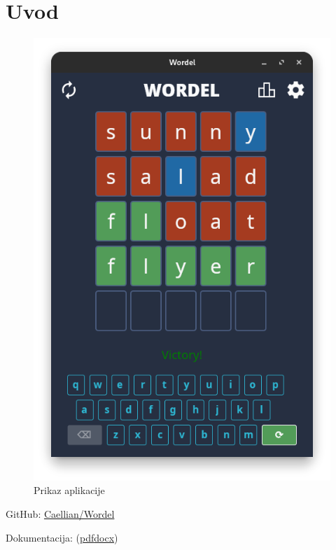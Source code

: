 \documentclass[12pt,a4paper]{report}
\begin{document}
\thispagestyle{empty}




\tableofcontents
\newpage

\setcounter{page}{1}

\chapter{Uvod}

\begin{figure}
\centering
\includegraphics{../img/preview.png}
\caption{Prikaz aplikacije}
\end{figure}

{
    \raggedright

    GitHub:
    \href{https://github.com/Caellian/Wordel}{Caellian/Wordel}
    
    Dokumentacija:
    (\href{https://github.com/Caellian/Wordel/raw/main/tin_svagelj.pdf}{pdf}\textbar{}\href{https://github.com/Caellian/Wordel/raw/main/tin_svagelj.docx}{docx})    
}
\bigskip
\end{document}
